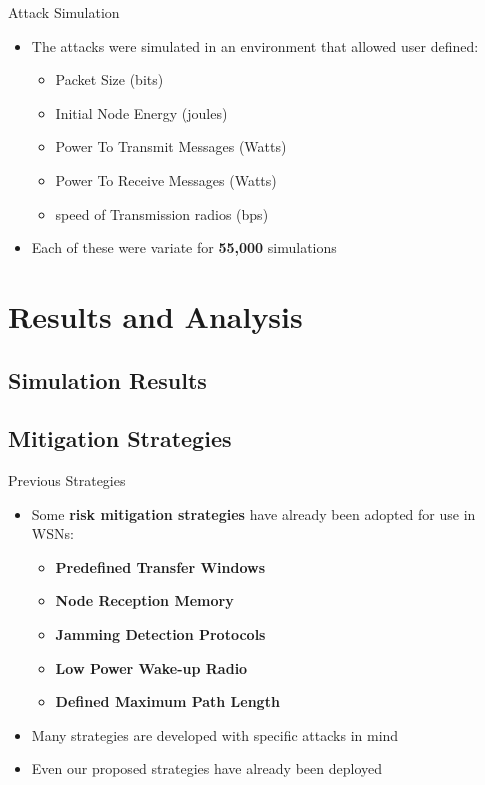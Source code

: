 \documentclass{beamer}
\begin{document}
\begin{frame}{Attack Simulation}
	\begin{itemize}
	\item The attacks were simulated in an environment that allowed user defined: 
	\begin{itemize}
		\item Packet Size (bits)
		\item Initial Node Energy (joules)
		\item Power To Transmit Messages (Watts)
		\item Power To Receive Messages (Watts)
		\item speed of Transmission radios (bps)
	\end{itemize}
	\item Each of these were variate for \textbf{55,000} simulations
	\end{itemize}
\end{frame}



\section{Results and Analysis}

\subsection{Simulation Results}

\subsection{Mitigation Strategies}

\begin{frame}{Previous Strategies}

\begin{itemize}

	\item Some \textbf{risk mitigation strategies} have already been adopted for use in WSNs:
	\begin{itemize}
		\item \textbf{Predefined Transfer Windows}
		\item \textbf{Node Reception Memory}
		\item \textbf{Jamming Detection Protocols}
		\item \textbf{Low Power Wake-up Radio}
		\item \textbf{Defined Maximum Path Length}
	\end{itemize}
	\item Many strategies are developed with specific attacks in mind
	\item Even our proposed strategies have already been deployed
	
\end{itemize}

\end{frame}
\end{document}
